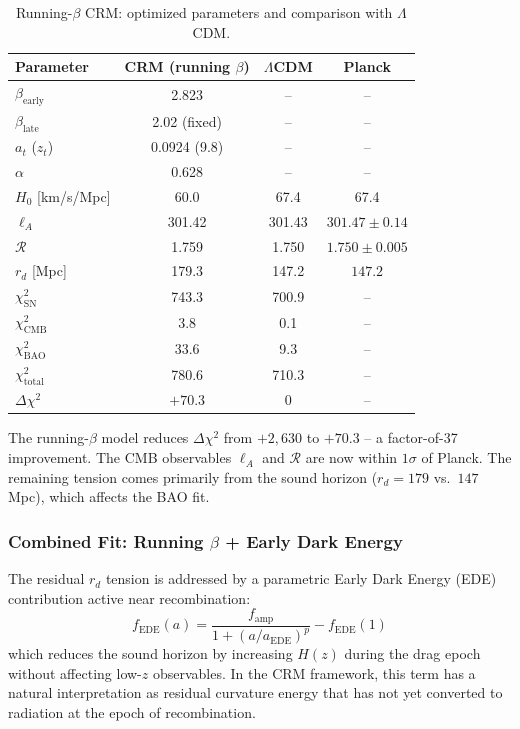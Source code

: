 \documentclass[aps,prd,twocolumn,superscriptaddress,nofootinbib]{revtex4-2}
\begin{document}
\begin{table}[H]
\centering
\caption{Running-$\beta$ CRM: optimized parameters and comparison with $\Lambda$CDM.}
\label{tab:running_beta}
\begin{tabular}{lccc}
\toprule
\textbf{Parameter} & \textbf{CRM (running $\beta$)} & \textbf{$\Lambda$CDM} & \textbf{Planck} \\
\midrule
$\beta_{\mathrm{early}}$ & 2.823 & -- & -- \\
$\beta_{\mathrm{late}}$ & 2.02 (fixed) & -- & -- \\
$a_t$ ($z_t$) & 0.0924 (9.8) & -- & -- \\
$\alpha$ & 0.628 & -- & -- \\
$H_0$ [km/s/Mpc] & 60.0 & 67.4 & 67.4 \\
\midrule
$\ell_A$ & 301.42 & 301.43 & $301.47 \pm 0.14$ \\
$\mathcal{R}$ & 1.759 & 1.750 & $1.750 \pm 0.005$ \\
$r_d$ [Mpc] & 179.3 & 147.2 & $147.2$ \\
\midrule
$\chi^2_{\mathrm{SN}}$ & 743.3 & 700.9 & -- \\
$\chi^2_{\mathrm{CMB}}$ & 3.8 & 0.1 & -- \\
$\chi^2_{\mathrm{BAO}}$ & 33.6 & 9.3 & -- \\
$\chi^2_{\mathrm{total}}$ & 780.6 & 710.3 & -- \\
$\Delta\chi^2$ & $+70.3$ & 0 & -- \\
\bottomrule
\end{tabular}
\end{table}

The running-$\beta$ model reduces $\Delta\chi^2$ from $+2{,}630$ to $+70.3$ -- a factor-of-37 improvement. The CMB observables $\ell_A$ and $\mathcal{R}$ are now within $1\sigma$ of Planck. The remaining tension comes primarily from the sound horizon ($r_d = 179$ vs.\ $147$\,Mpc), which affects the BAO fit.

\subsubsection{Combined Fit: Running $\beta$ + Early Dark Energy}

The residual $r_d$ tension is addressed by a parametric Early Dark Energy (EDE) contribution active near recombination:
\begin{equation}
f_{\mathrm{EDE}}(a) = \frac{f_{\mathrm{amp}}}{1 + (a/a_{\mathrm{EDE}})^p} - f_{\mathrm{EDE}}(1)
\end{equation}
which reduces the sound horizon by increasing $H(z)$ during the drag epoch without affecting low-$z$ observables. In the CRM framework, this term has a natural interpretation as residual curvature energy that has not yet converted to radiation at the epoch of recombination.
\end{document}
